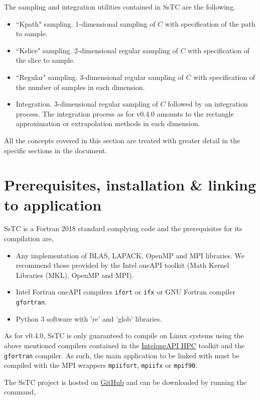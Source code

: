 \documentclass[10pt,a4paper]{article}
\begin{document}
The sampling and integration utilities contained in SsTC are the following.
\begin{tcolorbox}\begin{itemize}
\item ``Kpath" sampling. 1-dimensional sampling of $C$ with specification of the path to sample.
\item ``Kslice" sampling. 2-dimensional regular sampling of $C$ with specification of the slice to sample.
\item ``Regular" sampling. 3-dimensional regular sampling of $C$ with specification of the number of samples in each dimension.
\item Integration. 3-dimensional regular sampling of $C$ followed by an integration process. The integration process as for v0.4.0 amounts to the rectangle approximation or extrapolation methods in each dimension.
\end{itemize}\end{tcolorbox}
All the concepts covered in this section are treated with greater detail in the specific sections in the document.
\section{Prerequisites, installation \& linking to application}\label{sec:install}
SsTC is a Fortran 2018 standard complying code and the prerequisites for its compilation are,
\begin{tcolorbox}\begin{itemize}
\item Any implementation of BLAS, LAPACK, OpenMP and MPI libraries. We recommend those provided by the Intel oneAPI toolkit (Math Kernel Libraries (MKL), OpenMP and MPI).
\item Intel Fortran oneAPI compilers \verb|ifort| or \verb|ifx| or GNU Fortran compiler \verb|gfortran|.
\item Python 3 software with 're' and 'glob' libraries.
\end{itemize}\end{tcolorbox}
As for v0.4.0, SsTC is only guaranteed to compile on Linux systems using the above mentioned compilers contained in the \href{https://www.intel.com/content/www/us/en/developer/tools/oneapi/hpc-toolkit.html}{Intel\textregistered oneAPI HPC} toolkit and the \verb|gfortran| compiler. As such, the main application to be linked with must be compiled with the MPI wrappers \verb|mpiifort|, \verb|mpiifx| or \verb|mpif90|.

The SsTC project is hosted on \href{https://github.com/irukoa/SsTC}{GitHub} and can be downloaded by running the command,
\end{document}
